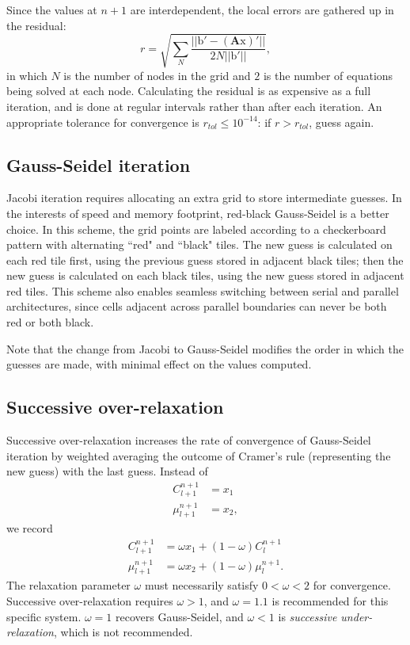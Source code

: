 	Since the values at $n+1$ are interdependent, the local errors are gathered up in the residual:
	\[r = \sqrt{\sum\limits_{N}\frac{||\mathrm{b}' - \left(\mathbf{A}\mathrm{x}\right)'||}{2N||\mathrm{b}'||}},\]
	in which $N$ is the number of nodes in the grid and $2$ is the number of equations being solved at each node.
	Calculating the residual is as expensive as a full iteration, and is done at regular intervals rather than after each iteration.
	An appropriate tolerance for convergence is $r_{tol}\leq10^{-14}$: if $r>r_{tol}$, guess again.

	\subsection{Gauss-Seidel iteration}
	Jacobi iteration requires allocating an extra grid to store intermediate guesses.
	In the interests of speed and memory footprint, red-black Gauss-Seidel is a better choice.
	In this scheme, the grid points are labeled according to a checkerboard pattern with alternating ``red" and ``black" tiles.
	The new guess is calculated on each red tile first, using the previous guess stored in adjacent black tiles;
	then the new guess is calculated on each black tiles, using the new guess stored in adjacent red tiles.
	This scheme also enables seamless switching between serial and parallel architectures, since cells adjacent
	across parallel boundaries can never be both red or both black.
	
	Note that the change from Jacobi to Gauss-Seidel modifies the order in which the guesses are made,
	with minimal effect on the values computed.
	
	\subsection{Successive over-relaxation}
	Successive over-relaxation increases the rate of convergence of Gauss-Seidel iteration by weighted averaging
	the outcome of Cramer's rule (representing the new guess) with the last guess.
	Instead of
	\begin{align*}
		C_{l+1}^{n+1} &= x_1\\
		\mu_{l+1}^{n+1} &= x_2,
	\end{align*}
	we record
	\begin{align*}
		C_{l+1}^{n+1} &= \omega x_1 + (1-\omega)C_l^{n+1} \\
		\mu_{l+1}^{n+1} &= \omega x_2 + (1-\omega)\mu_l^{n+1}.
	\end{align*}
	The relaxation parameter $\omega$ must necessarily satisfy $0<\omega<2$ for convergence.
	Successive over-relaxation requires $\omega>1$, and $\omega=1.1$ is recommended for this specific system.
	$\omega=1$ recovers Gauss-Seidel, and $\omega<1$ is \emph{successive under-relaxation}, which is not recommended.

